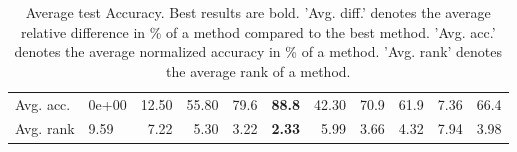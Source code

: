 \begin{table}[ht!]
\begin{tabular}{llrrllrllrl}
  Avg. acc. & 0e+00 & 12.50 & 55.80 & 79.6 & \textbf{88.8} & 42.30 & 70.9 & 61.9 & 7.36 & 66.4 \\ 
  Avg. rank & 9.59 & 7.22 & 5.30 & 3.22 & \textbf{2.33} & 5.99 & 3.66 & 4.32 & 7.94 & 3.98 \\ 
   \hline
\hline
\end{tabular}
\endgroup
\caption{Average test Accuracy. 
                  Best results are bold. 
                  'Avg. diff.' denotes the average relative difference in \% of a method compared to the best method.
                  'Avg. acc.' denotes the average normalized accuracy in \% of a method.
                  'Avg. rank' denotes the average rank of a method.} 
\label{TABLES/table_results_Accuracy}
\end{table}
